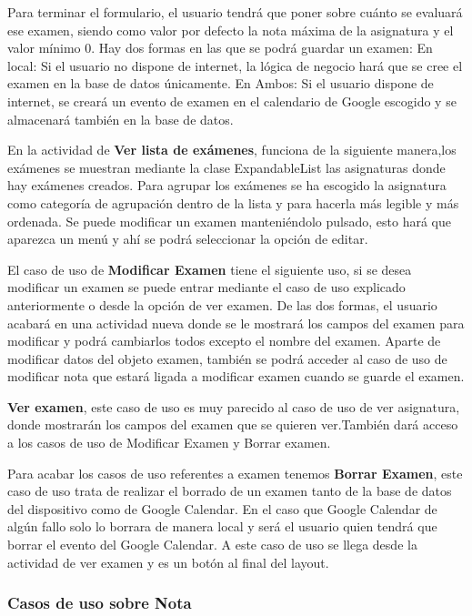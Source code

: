 Para terminar el formulario, el usuario tendrá que poner sobre cuánto se evaluará ese examen, siendo como valor por defecto la nota máxima de la asignatura y el valor mínimo 0.
Hay dos formas en las que se podrá guardar un examen:
En local: Si el usuario no dispone de internet, la lógica de negocio hará que se cree el examen en la base de datos únicamente.
En Ambos: Si el usuario dispone de internet, se creará un evento de examen en el calendario de Google escogido  y se almacenará también en la base de datos.


En la actividad de \textbf{Ver lista de exámenes}, funciona de la siguiente manera,los exámenes se muestran mediante la clase ExpandableList las asignaturas donde hay exámenes creados. Para agrupar los exámenes se ha escogido la asignatura como categoría de agrupación dentro de la lista y para hacerla más legible y más ordenada.
Se puede modificar un examen manteniéndolo pulsado, esto hará que aparezca un menú y ahí se podrá seleccionar la opción de editar.

El caso de uso de \textbf{Modificar Examen} tiene el siguiente uso, si se desea modificar un examen se puede entrar mediante el caso de uso explicado anteriormente o desde la opción de ver examen. De las dos formas, el usuario acabará en una actividad nueva donde se le mostrará los campos del examen para modificar y podrá cambiarlos todos excepto el nombre del examen.
Aparte de modificar datos del objeto examen, también se podrá acceder al caso de uso de modificar nota  que estará ligada a modificar examen cuando se guarde el examen.

\textbf{Ver examen}, este caso de uso es muy parecido al caso de uso de ver asignatura, donde mostrarán los campos del examen que se quieren ver.También dará acceso a los casos de uso de Modificar Examen y Borrar examen.


Para acabar los casos de uso referentes a examen tenemos \textbf{Borrar Examen}, este caso de uso trata de realizar el borrado de un examen tanto de la base de datos del dispositivo como de Google Calendar. En el caso que Google Calendar de algún fallo solo lo borrara de manera local y será el usuario quien tendrá que borrar el evento del Google Calendar.
A este caso de uso se llega desde la actividad de ver examen y es un botón al final del layout.

\subsubsection{Casos de uso sobre Nota}
\label{subsubsecc:Casos de uso sobre Nota}

